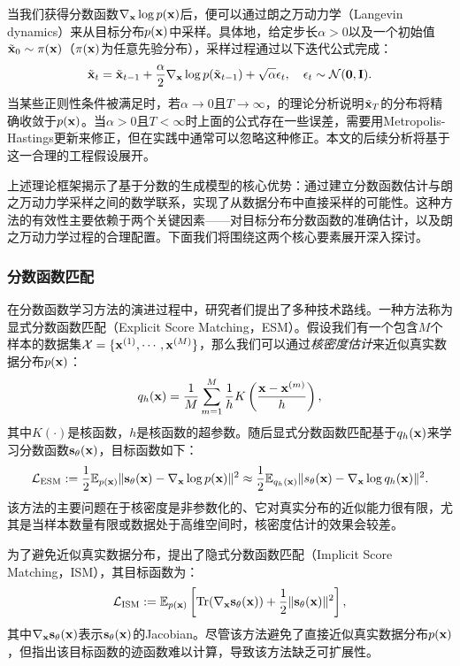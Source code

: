\documentclass[11pt,a4paper,UTF8]{ctexart}
\begin{document}
当我们获得分数函数$\nabla_{\mathbf{x}}\log p(\mathbf{x})$后，便可以通过朗之万动力学（Langevin dynamics）来从目标分布$p(\mathbf{x})$中采样。具体地，给定步长$\alpha>0$以及一个初始值$\tilde{\mathbf{x}}_0\sim\pi(\mathbf{x})$（$\pi(\mathbf{x})$为任意先验分布），采样过程通过以下迭代公式完成：
\begin{equation*}
    \tilde{\mathbf{x}}_t = \tilde{\mathbf{x}}_{t-1} + \frac{\alpha}{2} \nabla_{\mathbf{x}}\log p(\tilde{\mathbf{x}}_{t-1}) + \sqrt{\alpha}\epsilon_t,\quad \epsilon_t\sim\mathcal{N}(\mathbf{0},\mathbf{I}).
\end{equation*}
当某些正则性条件被满足时，若$\alpha\rightarrow 0$且$T\rightarrow \infty$，\cite{max2011bayesian}的理论分析说明$\tilde{\mathbf{x}}_T$的分布将精确收敛于$p(\mathbf{x})$。当$\alpha> 0$且$T< \infty$时上面的公式存在一些误差，需要用Metropolis-Hastings更新来修正，但在实践中通常可以忽略这种修正\cite{du2019implicit,nijkamp2019anatomy}。本文的后续分析将基于这一合理的工程假设展开。

上述理论框架揭示了基于分数的生成模型的核心优势：通过建立分数函数估计与朗之万动力学采样之间的数学联系，实现了从数据分布中直接采样的可能性。这种方法的有效性主要依赖于两个关键因素——对目标分布分数函数的准确估计，以及朗之万动力学过程的合理配置。下面我们将围绕这两个核心要素展开深入探讨。

\subsubsection{分数函数匹配}

在分数函数学习方法的演进过程中，研究者们提出了多种技术路线。一种方法称为显式分数函数匹配（Explicit Score Matching，ESM）\cite{vincent2011connection}。假设我们有一个包含$M$个样本的数据集$\mathcal{X}=\{\mathbf{x}^{(1)},\cdots,\mathbf{x}^{(M)}\}$，那么我们可以通过\emph{核密度估计}来近似真实数据分布$p(\mathbf{x})$：
\begin{equation*}
    q_h(\mathbf{x})=\frac{1}{M}\sum_{m=1}^M \frac{1}{h} K\left(\frac{\mathbf{x}-\mathbf{x}^{(m)}}{h} \right),
\end{equation*}
其中$K(\cdot)$是核函数，$h$是核函数的超参数。随后显式分数函数匹配基于$q_h(\mathbf{x})$来学习分数函数$\mathbf{s}_\theta(\mathbf{x})$，目标函数如下：
\begin{equation*}
    \mathcal{L}_{\text{ESM}}:=\frac{1}{2}\mathbb{E}_{p(\mathbf{x})} \|\mathbf{s}_\theta(\mathbf{x})-\nabla_{\mathbf{x}}\log p(\mathbf{x}) \|^2 \approx \frac{1}{2}\mathbb{E}_{q_h(\mathbf{x})} \| s_\theta(\mathbf{x})-\nabla_{\mathbf{x}}\log q_h(\mathbf{x})\|^2.
\end{equation*}
该方法的主要问题在于核密度是非参数化的、它对真实分布的近似能力很有限，尤其是当样本数量有限或数据处于高维空间时，核密度估计的效果会较差。

为了避免近似真实数据分布，\cite{Hyvrinen2005EstimationON}提出了隐式分数函数匹配（Implicit Score Matching，ISM），其目标函数为：
\begin{equation*}
    \mathcal{L}_{\text{ISM}}:=\mathbb{E}_{p(\mathbf{x})} \left[\text{Tr}(\nabla_{\mathbf{x}} \mathbf{s}_\theta (\mathbf{x})) + \frac{1}{2}\|\mathbf{s}_\theta (\mathbf{x}) \|^2 \right],
\end{equation*}
其中$\nabla_{\mathbf{x}} \mathbf{s}_\theta (\mathbf{x})$表示$\mathbf{s}_\theta (\mathbf{x})$的Jacobian。尽管该方法避免了直接近似真实数据分布$p(\mathbf{x})$，但\cite{song2019generative}指出该目标函数的迹函数难以计算，导致该方法缺乏可扩展性。
\end{document}
